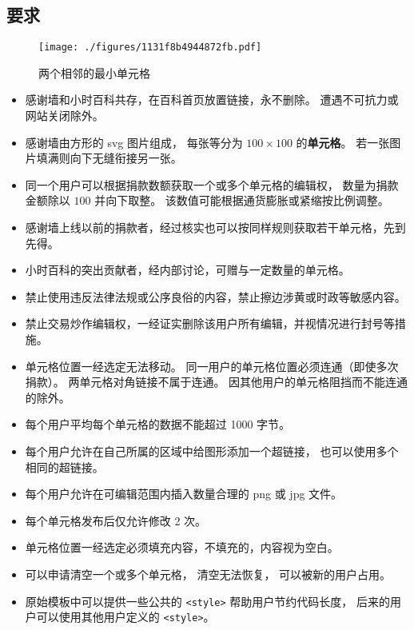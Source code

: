 
\begin{issues}
\issueDraft
{}
\end{issues}

\subsection{要求}

\begin{figure}[ht]
\centering
\texttt{[image: ./figures/1131f8b4944872fb.pdf]}
\caption{两个相邻的最小单元格} \label{fig_thanks_1}
\end{figure}

\begin{itemize}
\item 感谢墙和小时百科共存，在百科首页放置链接，永不删除。 遭遇不可抗力或网站关闭除外。
\item 感谢墙由方形的 svg 图片组成， 每张等分为 $100\times 100$ 的\textbf{单元格}。 若一张图片填满则向下无缝衔接另一张。
\item 同一个用户可以根据捐款数额获取一个或多个单元格的编辑权， 数量为捐款金额除以 $100$ 并向下取整。 该数值可能根据通货膨胀或紧缩按比例调整。
\item 感谢墙上线以前的捐款者，经过核实也可以按同样规则获取若干单元格，先到先得。
\item 小时百科的突出贡献者，经内部讨论，可赠与一定数量的单元格。
\item 禁止使用违反法律法规或公序良俗的内容，禁止擦边涉黄或时政等敏感内容。
\item 禁止交易炒作编辑权，一经证实删除该用户所有编辑，并视情况进行封号等措施。
\item 单元格位置一经选定无法移动。 同一用户的单元格位置必须连通（即使多次捐款）。 两单元格对角链接不属于连通。 因其他用户的单元格阻挡而不能连通的除外。
\item 每个用户平均每个单元格的数据不能超过 1000 字节。
\item 每个用户允许在自己所属的区域中给图形添加一个超链接， 也可以使用多个相同的超链接。
\item 每个用户允许在可编辑范围内插入数量合理的 png 或 jpg 文件。
\item 每个单元格发布后仅允许修改 2 次。
\item 单元格位置一经选定必须填充内容，不填充的，内容视为空白。
\item 可以申请清空一个或多个单元格， 清空无法恢复， 可以被新的用户占用。
\item 原始模板中可以提供一些公共的 \verb`<style>` 帮助用户节约代码长度， 后来的用户可以使用其他用户定义的 \verb`<style>`。
\end{itemize}

